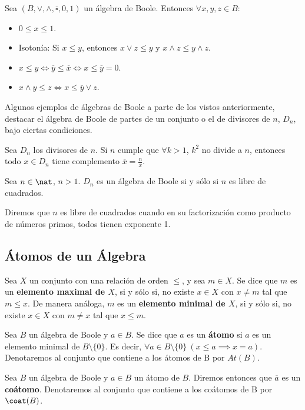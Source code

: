 \smallskip
\begin{properties}
    Sea $(B, \lor, \land, \overline{\square}, 0, 1)$ un álgebra de Boole. Entonces $\forall x,y,z \in B$:
    \begin{itemize}
        \item $0 \leq x \leq 1$.
        \item Isotonía: Si $x \leq y$, entonces $x \lor z \leq y$ y $x \land z \leq y \land z$.
        \item $x\leq y \Longleftrightarrow \overline{y} \leq \overline{x} \Longleftrightarrow x \leq \overline{y} = 0$.
        \item $x \land y \leq z \Longleftrightarrow x \leq \overline{y} \lor z$.
    \end{itemize}
\end{properties}
\begin{ejemplo}
    Algunos ejemplos de álgebras de Boole a parte de los vistos anteriormente, destacar el álgebra de Boole de partes de un conjunto o el de divisores de $n$,
    $D_n$, bajo ciertas condiciones.
\end{ejemplo}

\begin{nprop}
    Sea $D_n$ los divisores de $n$. Si $n$ cumple que $\forall k > 1$, $k^2$ no divide a $n$, entonces todo $x \in D_n$ tiene complemento $\overline{x} = \frac{n}{x}$.
\end{nprop}
\begin{nprop}
    Sea $n \in \nat$, $n > 1$. $D_n$ es un álgebra de Boole si y sólo si $n$ es libre de cuadrados.
\end{nprop}
\begin{nota}
    Diremos que $n$ es libre de cuadrados cuando en su factorización como producto de números primos, todos tienen exponente 1.
\end{nota}

\subsection{Átomos de un Álgebra}
\begin{ndef}
    Sea $X$ un conjunto con una relación de orden $\leq$, y sea $m \in X$. Se dice que $m$ es un \textbf{elemento maximal de $X$}, si y sólo si, no existe $x \in X$ con $x \neq m$ tal que $m \leq x$.
    De manera análoga, $m$ es un \textbf{elemento minimal de $X$}, si y sólo si, no existe $x \in X$ con $m \neq x$ tal que $x \leq m$.
\end{ndef}
\begin{ndef}[Átomo]
    Sea $B$ un álgebra de Boole y $a \in B$. Se dice que $a$ es un \textbf{átomo} si $a$ es un elemento minimal de $B \setminus \{0\}$. Es decir,
    $\forall a \in B \setminus \{0\} \ (x \leq a \implies x = a)$. Denotaremos al conjunto que contiene a los átomos de B por $At(B)$.
\end{ndef}
\begin{ndef}[Coátomo]
    Sea $B$ un álgebra de Boole y $a \in B$ un átomo de $B$. Diremos entonces que $\overline{a}$ es un \textbf{coátomo}.
    Denotaremos al conjunto que contiene a los coátomos de B por $\coat(B)$.
\end{ndef}

